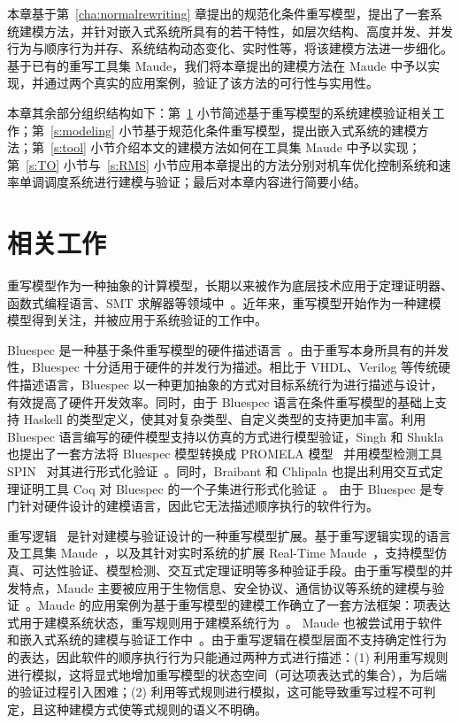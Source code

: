 本章基于第~\ref{cha:normalrewriting} 章提出的规范化条件重写模型，提出了一套系统建模方法，并针对嵌入式系统所具有的若干特性，如层次结构、高度并发、并发行为与顺序行为并存、系统结构动态变化、实时性等，将该建模方法进一步细化。基于已有的重写工具集 Maude，我们将本章提出的建模方法在 Maude 中予以实现，并通过两个真实的应用案例，验证了该方法的可行性与实用性。

本章其余部分组织结构如下：第~\ref{s:modeling-related} 小节简述基于重写模型的系统建模验证相关工作；第~\ref{s:modeling} 小节基于规范化条件重写模型，提出嵌入式系统的建模方法；第~\ref{s:tool} 小节介绍本文的建模方法如何在工具集 Maude 中予以实现；第~\ref{s:TO} 小节与~\ref{s:RMS} 小节应用本章提出的方法分别对机车优化控制系统和速率单调调度系统进行建模与验证；最后对本章内容进行简要小结。 


\section{相关工作}
\label{s:modeling-related} 

重写模型作为一种抽象的计算模型，长期以来被作为底层技术应用于定理证明器、函数式编程语言、SMT 求解器等领域中~\cite{assaf16a,DBLP:conf/lics/JouannaudO91,DBLP:conf/cav/Nadel14}。近年来，重写模型开始作为一种建模模型得到关注，并被应用于系统验证的工作中。

Bluespec 是一种基于条件重写模型的硬件描述语言~\cite{nikhil2008bluespec}。由于重写本身所具有的并发性，Bluespec 十分适用于硬件的并发行为描述。相比于 VHDL、Verilog 等传统硬件描述语言，Bluespec 以一种更加抽象的方式对目标系统行为进行描述与设计，有效提高了硬件开发效率。同时，由于 Bluespec 语言在条件重写模型的基础上支持 Haskell 的类型定义，使其对复杂类型、自定义类型的支持更加丰富。利用 Bluespec 语言编写的硬件模型支持以仿真的方式进行模型验证，Singh 和 Shukla 也提出了一套方法将 Bluespec 模型转换成 PROMELA 模型~\cite{DBLP:journals/cn/Holzmann93} 并用模型检测工具 SPIN~\cite{DBLP:journals/tse/Holzmann97} 对其进行形式化验证~\cite{DBLP:conf/mtv/SinghS07}。同时，Braibant 和 Chlipala 也提出利用交互式定理证明工具 Coq 对 Bluespec 的一个子集进行形式化验证~\cite{DBLP:conf/cav/BraibantC13}。 由于 Bluespec 是专门针对硬件设计的建模语言，因此它无法描述顺序执行的软件行为。 

重写逻辑~\cite{DBLP:journals/tcs/Marte-OlietM02,DBLP:journals/jlp/Meseguer12} 是针对建模与验证设计的一种重写模型扩展。基于重写逻辑实现的语言及工具集 Maude~\cite{DBLP:journals/tcs/ClavelDELMMQ02}，以及其针对实时系统的扩展 Real-Time Maude~\cite{DBLP:journals/lisp/OlveczkyM07}，支持模型仿真、可达性验证、模型检测、交互式定理证明等多种验证手段。由于重写模型的并发特点，Maude 主要被应用于生物信息、安全协议、通信协议等系统的建模与验证~\cite{DBLP:journals/jlp/Meseguer12,DBLP:journals/iandc/MeseguerR13}。Maude 的应用案例为基于重写模型的建模工作确立了一套方法框架：项表达式用于建模系统状态，重写规则用于建模系统行为~\cite{DBLP:conf/maude/2007}。 Maude 也被尝试用于软件和嵌入式系统的建模与验证工作中~\cite{DBLP:journals/scp/BaeKMO15}。由于重写逻辑在模型层面不支持确定性行为的表达，因此软件的顺序执行行为只能通过两种方式进行描述：(1) 利用重写规则进行模拟，这将显式地增加重写模型的状态空间（可达项表达式的集合），为后端的验证过程引入困难；(2) 利用等式规则进行模拟，这可能导致重写过程不可判定，且这种建模方式使等式规则的语义不明确。


